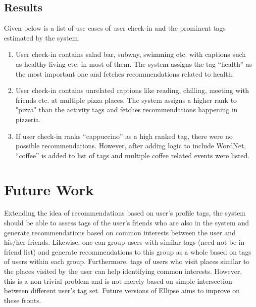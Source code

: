 \documentclass[12pt,letterpaper]{article}
\begin{document}
\subsection{Results}
Given below is a list of use cases of user check-in and the prominent tags estimated by the system.
\begin{enumerate}
\item User check-in contains salad bar, subway, swimming etc. with captions such as healthy living etc. in most of them. The system assigns the tag \enquote{health} as the most important one and fetches recommendations related to health.
\item User check-in contains unrelated captions like reading, chilling, meeting with friends etc. at multiple pizza places. The system assigns a higher rank to "pizza" than the activity tags and fetches recommendations happening in pizzeria.
\item If user check-in ranks \enquote{cappuccino} as a high ranked tag, there were no possible recommendations. However, after adding logic to include WordNet, \enquote{coffee} is added to list of tags and multiple coffee related events were listed.
\end{enumerate}

\section{Future Work}
Extending the idea of recommendations based on user’s profile tags, the system should be able to assess tags of the user’s friends who are also in the system and generate recommendations based on common interests between the user and his/her friends. Likewise, one can group users with similar tags (need not be in friend list) and generate recommendations to this group as a whole based on tags of users within each group. Furthermore, tags of users who visit places similar to the places visited by the user can help identifying common interests. However, this is a non trivial problem and is not merely based on simple intersection between different user’s tag set. Future versions of Ellipse aims to improve on these fronts.
\end{document}
